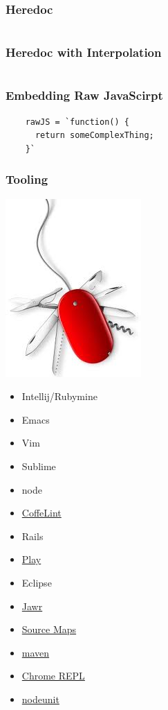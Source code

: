 \documentclass{beamer}
\begin{document}
\begin{frame}
  \frametitle{Heredoc}
  \inputminted{coffeescript}{src/heredoc.coffee}
\end{frame}

\begin{frame}
  \frametitle{Heredoc with Interpolation}
  \inputminted{coffeescript}{src/heredoc_interp.coffee}
\end{frame}

\begin{frame}[fragile]
  \frametitle{Embedding Raw JavaScirpt}
  \begin{verbatim}
    rawJS = `function() {
      return someComplexThing;
    }`
  \end{verbatim}
\end{frame}


\begin{frame}
  \frametitle{Tooling}
    \includegraphics[scale=.40]{tooling}
  \begin{multicols}{2}
  \begin{itemize}
    \item Intellij/Rubymine
    \item Emacs
    \item Vim
    \item Sublime
    \item node
    \item \href{http://www.coffeelint.org/}{CoffeLint}
    \item Rails
    \item \href{http://www.playframework.com/documentation/2.0/AssetsCoffeeScript}{Play}
    \item Eclipse
    \item \href{https://jawr.java.net/}{Jawr}
    \item
      \href{http://www.html5rocks.com/en/tutorials/developertools/sourcemaps/}{Source
      Maps}
    \item \href{https://github.com/talios/coffee-maven-plugin}{maven}
    \item 
      \href{https://chrome.google.com/webstore/detail/coffeereplconsole/eoifmnkmfmjellmlicakeocfjmhdjgfl}{Chrome
        REPL}
    \item \href{https://github.com/caolan/nodeunit}{nodeunit}

  \end{itemize}
\end{multicols}
\end{frame}
\end{document}
